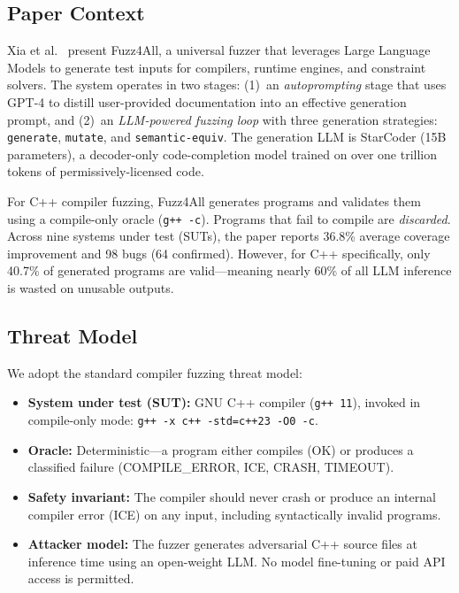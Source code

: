 \documentclass[conference]{IEEEtran}
\begin{document}
\subsection{Paper Context}

Xia et al.~\cite{xia2024fuzz4all} present Fuzz4All, a universal fuzzer that leverages Large Language Models to generate test inputs for compilers, runtime engines, and constraint solvers. The system operates in two stages: (1)~an \emph{autoprompting} stage that uses GPT-4 to distill user-provided documentation into an effective generation prompt, and (2)~an \emph{LLM-powered fuzzing loop} with three generation strategies: \texttt{generate}, \texttt{mutate}, and \texttt{semantic-equiv}. The generation LLM is StarCoder (15B parameters), a decoder-only code-completion model trained on over one trillion tokens of permissively-licensed code.

For C++ compiler fuzzing, Fuzz4All generates programs and validates them using a compile-only oracle (\texttt{g++ -c}). Programs that fail to compile are \emph{discarded}. Across nine systems under test (SUTs), the paper reports 36.8\% average coverage improvement and 98 bugs (64 confirmed). However, for C++ specifically, only 40.7\% of generated programs are valid---meaning nearly 60\% of all LLM inference is wasted on unusable outputs.

\subsection{Threat Model}

We adopt the standard compiler fuzzing threat model:
\begin{itemize}
    \item \textbf{System under test (SUT):} GNU C++ compiler (\texttt{g++ 11}), invoked in compile-only mode: \texttt{g++ -x c++ -std=c++23 -O0 -c}.
    \item \textbf{Oracle:} Deterministic---a program either compiles (OK) or produces a classified failure (COMPILE\_ERROR, ICE, CRASH, TIMEOUT).
    \item \textbf{Safety invariant:} The compiler should never crash or produce an internal compiler error (ICE) on any input, including syntactically invalid programs.
    \item \textbf{Attacker model:} The fuzzer generates adversarial C++ source files at inference time using an open-weight LLM. No model fine-tuning or paid API access is permitted.
\end{itemize}
\end{document}
